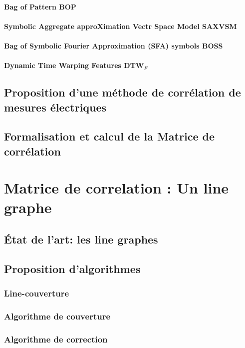 \documentclass[onecolumn, 12pt]{book}
\begin{document}
			\subsubsection{Bag of Pattern BOP}
			\subsubsection{Symbolic Aggregate approXimation Vectr Space Model SAXVSM}
			\subsubsection{Bag of Symbolic Fourier Approximation (SFA) symbols BOSS}
			\subsubsection{Dynamic Time Warping Features DTW$_{F}$}
	\section{Proposition d'une m\'ethode de corr\'elation de mesures \'electriques}
	\section{Formalisation et calcul de la Matrice de corr\'elation}
	
\chapter{Matrice de correlation : Un line graphe }
	\section{\'Etat de l'art: les line graphes}
	\section{Proposition d'algorithmes}
		\subsection{Line-couverture}
		\subsection{Algorithme de couverture}
		\subsection{Algorithme de correction}
\end{document}
